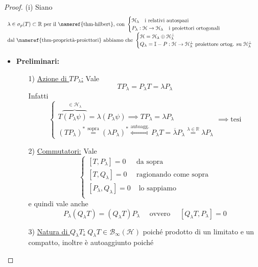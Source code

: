 \documentclass[a4paper,10pt]{article}
\theoremstyle{definition}
\newcommand{\re}{\mathbb{R}} %
\newcommand{\hil}{\mathcal{H}} %
\theoremstyle{indentdefinition}
\theoremstyle{indenttheorem}
\theoremstyle{myremark}
\theoremstyle{indentgeneral}
\begin{document}
\begin{proof} (i) Siano 
$$\begin{array}{l}
     \text{$\lambda\in\sigma_p(T)\subset\re$ per il \nameref{thm-hilbert}, con }\begin{cases}
         \hil_\lambda \quad \text{i relativi autospazi}\\
         P_\lambda:\hil\to\hil_\lambda \quad \text{i proiettori ortogonali}
     \end{cases}  \\
     \text{dal \nameref{thm-proprietà-proiettori} abbiamo che }\begin{cases}
        \hil=\hil_\lambda\oplus\hil_{\lambda}^\perp\\
        Q_\lambda=\mathbb{I}-P:\hil\to\hil_\lambda^\perp \text{  
  proiettore ortog. su }\hil_\lambda^\perp
    \end{cases}
\end{array}$$
\begin{itemize}
    \item \textbf{Preliminari:}
    \begin{itemize}
        \item[1)] \underline{Azione di $TP_\lambda$:} Vale 
        $$TP_\lambda=P_\lambda T=\lambda P_\lambda$$
        Infatti
        $$\begin{cases}T\overbrace{(P_\lambda\psi)}^{\in\hil_\lambda}=\lambda(P_\lambda\psi)\implies TP_\lambda=\lambda P_\lambda\\
            (TP_\lambda)^*\overset{\text{sopra}}{=}(\lambda P_\lambda)^*\overset{\text{autoagg.}}{\iff}P_\lambda T=\overline{\lambda}P_\lambda\overset{\lambda\in\re}{=}\lambda P_\lambda
        \end{cases}\implies \text{tesi}$$
        \item[2)] \underline{Commutatori:} Vale
        $$\begin{cases}
            [T,P_\lambda]=0 & \text{da sopra}\\
            [T,Q_\lambda]=0 & \text{ragionando come sopra}\\
            [P_\lambda, Q_\lambda]=0 & \text{ lo sappiamo}\\
        \end{cases}$$
        e quindi vale anche
        $$P_\lambda(Q_\lambda T)=(Q_\lambda T)P_\lambda \quad \text{ ovvero }\quad [Q_\lambda T,P_\lambda]=0$$
        \item[3)] \underline{Natura di $Q_\lambda T$:} $Q_\lambda T\in\mathcal{B}_\infty(\hil)$ poiché prodotto di un limitato e un compatto, inoltre è autoaggiunto poiché

\end{itemize}
\end{itemize}
\end{proof}
\end{document}
